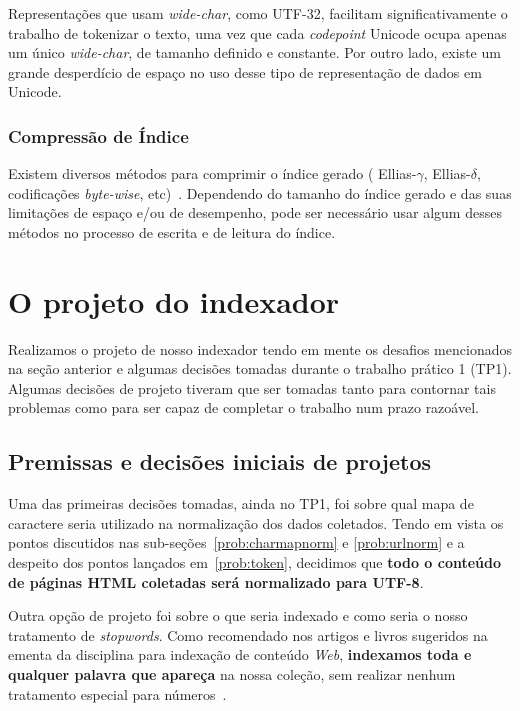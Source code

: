 \documentclass[10pt,twocolumn]{article}
\begin{document}
Representações que usam \emph{wide-char}, como UTF-32, facilitam
significativamente o trabalho de tokenizar o texto, uma vez que cada
\emph{codepoint} Unicode ocupa apenas um único \emph{wide-char}, de
tamanho definido e constante. Por outro lado, existe um grande
desperdício de espaço no uso desse tipo de representação de dados em
Unicode.



\subsubsection{Compressão de Índice}

Existem diversos métodos para comprimir o índice gerado (
Ellias-\(\gamma\), Ellias-\(\delta\), codificações
\emph{byte-wise}, etc)~\cite{moffat1999managing,moffat2006survey}.
Dependendo do tamanho do índice gerado e das suas limitações de espaço
e/ou de desempenho, pode ser necessário usar algum desses métodos no
processo de escrita e de leitura do índice.


\section{O projeto do indexador}

Realizamos o projeto de nosso indexador tendo em mente os desafios
mencionados na seção anterior e algumas decisões tomadas durante o
trabalho prático 1 (TP1). Algumas decisões de projeto tiveram que
ser tomadas tanto para contornar tais problemas como para ser capaz de
completar o trabalho num prazo razoável.


\subsection{Premissas e decisões iniciais de projetos}

Uma das primeiras decisões tomadas, ainda no TP1, foi sobre qual mapa de
caractere seria utilizado na normalização dos dados coletados.
Tendo em vista os pontos discutidos nas
sub-seções~\ref{prob:charmapnorm} e \ref{prob:urlnorm} e a despeito dos
pontos lançados em~\ref{prob:token}, decidimos que
\textbf{todo o conteúdo de páginas HTML coletadas será normalizado para
UTF-8}.

Outra opção de projeto foi sobre o que seria indexado e como seria o
nosso tratamento de \emph{stopwords}. Como recomendado nos artigos e
livros sugeridos na ementa da disciplina para indexação de conteúdo
\emph{Web}, \textbf{indexamos toda e qualquer palavra que apareça} na
nossa coleção, sem realizar nenhum tratamento especial para
números~\cite{moffat1999managing}.
\end{document}
